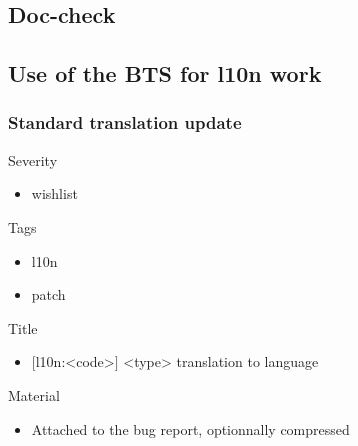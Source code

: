 \documentclass{beamer}
\begin{document}

\subsection{Doc-check}

\begin{frame}
  \frametitle{}
\end{frame}

\begin{frame}
  \frametitle{}
\end{frame}

\begin{frame}
  \frametitle{}
\end{frame}

\subsection{Use of the BTS for l10n work}

\begin{frame}
  \frametitle{Standard translation update}
	\begin{block}
		{Severity}
		\begin{itemize}
		\item
			wishlist
		\end{itemize}
	\end{block}
	\begin{block}
		{Tags}
		\begin{itemize}
		\item
			l10n
		\item
			patch
		\end{itemize}
	\end{block}
	\begin{block}
		{Title}
		\begin{itemize}
		\item
			$[$l10n:<code>$]$ <type> translation to language
		\end{itemize}
	\end{block}
	\begin{block}
		{Material}
		\begin{itemize}
		\item
			Attached to the bug report, optionnally compressed
		\end{itemize}
	\end{block}
\end{frame}

\begin{frame}
  \frametitle{}
\end{frame}
\end{document}
